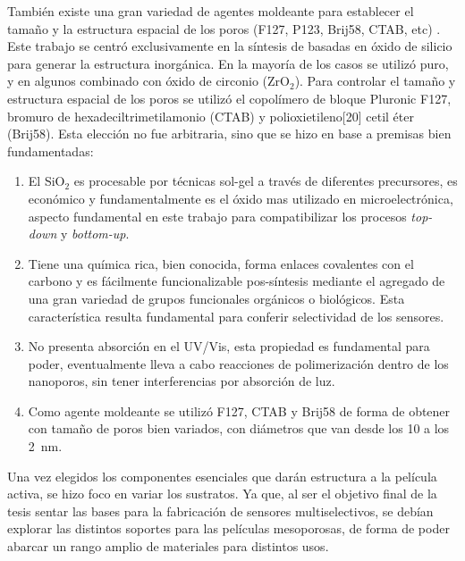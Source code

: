 	También existe una gran variedad de agentes moldeante para establecer el tamaño y la estructura espacial de los poros (F127, P123, Brij58, CTAB, etc) \cite{angelome2011,schuth2013,Soler-Illia2006,Soler-Illia2002a}. Este trabajo se centró exclusivamente en la síntesis de \pdm\space basadas en óxido de silicio para generar la estructura inorgánica. En la mayoría de los casos se utilizó puro, y en algunos combinado con óxido de circonio (ZrO$_2$). Para controlar el tamaño y estructura espacial de los poros se utilizó el copolímero de bloque Pluronic F127, bromuro de hexadeciltrimetilamonio (CTAB) y polioxietileno[20] cetil éter (Brij58). Esta elección no fue arbitraria, sino que se hizo en base a premisas bien fundamentadas:
		
		\begin{enumerate}

		\item El SiO$_2$ es procesable por técnicas sol-gel a través de diferentes precursores, es económico y fundamentalmente es el óxido mas utilizado en microelectrónica, aspecto fundamental en este trabajo para compatibilizar los procesos \textit{top-down} y \textit{bottom-up}.

		\item Tiene una química rica, bien conocida, forma enlaces covalentes con el carbono y es fácilmente funcionalizable pos-síntesis mediante el agregado de una gran variedad de grupos funcionales orgánicos o biológicos. Esta característica resulta fundamental para conferir selectividad de los sensores.

		\item No presenta absorción en el UV/Vis, esta propiedad es fundamental para poder, eventualmente lleva a cabo reacciones de polimerización dentro de los nanoporos, sin tener interferencias por absorción de luz.

		\item Como agente moldeante se utilizó F127, CTAB y Brij58 de forma de obtener \pdm\space con tamaño de poros bien variados, con diámetros que van desde los 10 a los \SI{2}{\nm}.

		\end{enumerate}
	
	Una vez elegidos los componentes esenciales que darán estructura a la película activa, se hizo foco en variar los sustratos. Ya que, al ser el objetivo final de la tesis sentar las bases para la fabricación de sensores multiselectivos, se debían explorar las distintos soportes para las películas mesoporosas, de forma de poder abarcar un rango amplio de materiales para distintos usos.

